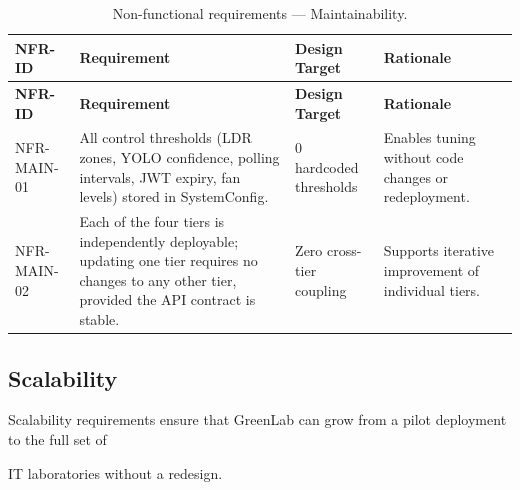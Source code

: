 \begin{longtable}{|L{2.5cm}|L{5.0cm}|L{3.2cm}|L{4.0cm}|}
	\caption{Non-functional requirements --- Maintainability.} \label{tab:3-20}                                                                                                                                                                           \\
	\hline
	\textbf{NFR-ID} & \textbf{Requirement}                                                                                                                              & \textbf{Design Target}   & \textbf{Rationale}                                   \\
	\hline
	\endfirsthead
	\hline
	\textbf{NFR-ID} & \textbf{Requirement}                                                                                                                              & \textbf{Design Target}   & \textbf{Rationale}                                   \\
	\hline
	\endhead
	\hline
	\endfoot
	\hline
	\endlastfoot
	NFR-MAIN-01     & All control thresholds (LDR zones, YOLO confidence, polling intervals, JWT expiry, fan levels) stored in SystemConfig.                            & 0 hardcoded thresholds   & Enables tuning without code changes or redeployment. \\
	\hline
	NFR-MAIN-02     & Each of the four tiers is independently deployable; updating one tier requires no changes to any other tier, provided the API contract is stable. & Zero cross-tier coupling & Supports iterative improvement of individual tiers.  \\
	\hline
\end{longtable}


\subsection{Scalability}
Scalability requirements ensure that GreenLab can grow from a pilot deployment to the full set of

IT laboratories without a redesign.

